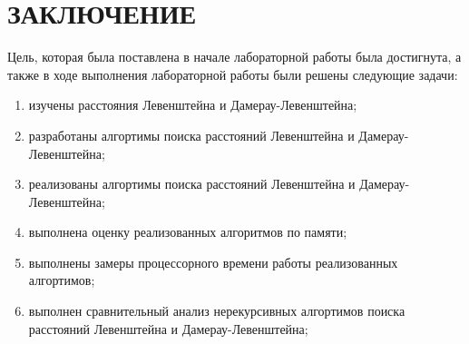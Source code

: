 \titleformat{\section}[hang]
{\bfseries\normalsize\filcenter}{\thesection}{1em}{}
\section*{ЗАКЛЮЧЕНИЕ}

Цель, которая была поставлена в начале лабораторной работы была достигнута, а также в ходе выполнения лабораторной работы были решены
следующие задачи:
\begin{enumerate}[leftmargin=1.6\parindent]
    \item изучены расстояния Левенштейна и Дамерау-Левенштейна;
    \item разработаны алгортимы поиска расстояний Левенштейна и Дамерау-Левенштейна;
    \item реализованы алгортимы поиска расстояний Левенштейна и Дамерау-Левенштейна;
    \item выполнена оценку реализованных алгоритмов по памяти;
    \item выполнены замеры процессорного времени работы реализованных алгортимов;
    \item выполнен сравнительный анализ нерекурсивных алгортимов поиска расстояний Левенштейна и Дамерау-Левенштейна;
\end{enumerate}

\pagebreak